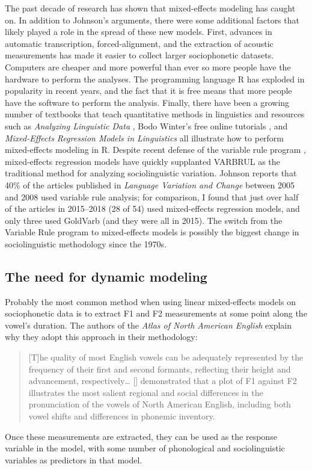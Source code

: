 The past decade of research has shown that mixed-effects modeling has caught on. In addition to Johnson's arguments, there were some additional factors that likely played a role in the spread of these new models. First, advances in automatic transcription, forced-alignment, and the extraction of acoustic measurements has made it easier to collect larger sociophonetic datasets. Computers are cheaper and more powerful than ever so more people have the hardware to perform the analyses. The programming language R \citep{r_2018} has exploded in popularity in recent years, and the fact that it is free means that more people have the software to perform the analysis. Finally, there have been a growing number of textbooks that teach quantitative methods in linguistics \citep{tagliamonte_2006, johnson_2008, macaulay_2009, gries_2009, gries_2010, levshina_2015, eddington_2015, grant_etal_2017, winter_2019} and resources such as \textit{Analyzing Linguistic Data} \citep{baayen_2008}, Bodo Winter's free online tutorials \citep{winter_2013}, and \textit{Mixed-Effects Regression Models in Linguistics} \citep{speelman_etal_2018} all illustrate how to perform mixed-effects modeling in R. Despite recent defense of the variable rule program \citep{tagliamonte_darcy_2017}, mixed-effects regression models have quickly supplanted VARBRUL as the traditional method for analyzing sociolinguistic variation. Johnson \citeyearpar[360]{johnson_2009} reports that 40\% of the articles published in \textit{Language Variation and Change} between 2005 and 2008 used variable rule analysis; for comparison, I found that just over half of the articles in 2015--2018 (28 of 54) used mixed-effects regression models, and only three used GoldVarb (and they were all in 2015). The switch from the Variable Rule program to mixed-effects models is possibly the biggest change in sociolinguistic methodology since the 1970s.

\subsection{The need for dynamic modeling}
\label{dynamic_modeling}

Probably the most common method when using linear mixed-effects models on sociophonetic data is to extract F1 and F2 measurements at some point along the vowel's duration. The authors of the \textit{Atlas of North American English} explain why they adopt this approach in their methodology:
\begin{quote}
    [T]he quality of most English vowels can be adequately represented by the frequency of their first and second formants, reflecting their height and advancement, respectively… [\citet{labov_1972_LYS}] demonstrated that a plot of F1 against F2 illustrates the most salient regional and social differences in the pronunciation of the vowels of North American English, including both vowel shifts and differences in phonemic inventory. \citep[37]{labov_ash_boberg_2006_anae}
\end{quote}
Once these measurements are extracted, they can be used as the response variable in the model, with some number of phonological and sociolinguistic variables as predictors in that model.


